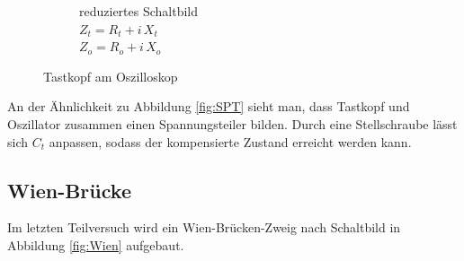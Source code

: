 \documentclass[10pt,a4paper]{scrartcl}
\begin{document}
\begin{figure}
\begin{subfigure}[b]{0.35\textwidth}
        \caption{reduziertes Schaltbild\\
            $Z_t=R_t+i\,X_t$\\
            $Z_o=R_o+i\,X_o$}
    \end{subfigure}
    \caption{Tastkopf am Oszilloskop} \label{fig:Tastkopf}
\end{figure}

An der Ähnlichkeit zu Abbildung \ref{fig:SPT} sieht man, dass Tastkopf und
Oszillator zusammen einen Spannungsteiler bilden.
Durch eine Stellschraube lässt sich $C_t$ anpassen,
sodass der kompensierte Zustand erreicht werden kann.

\subsection {Wien-Brücke}

Im letzten Teilversuch wird ein Wien-Brücken-Zweig nach Schaltbild
in Abbildung \ref{fig:Wien} aufgebaut.
\end{document}
